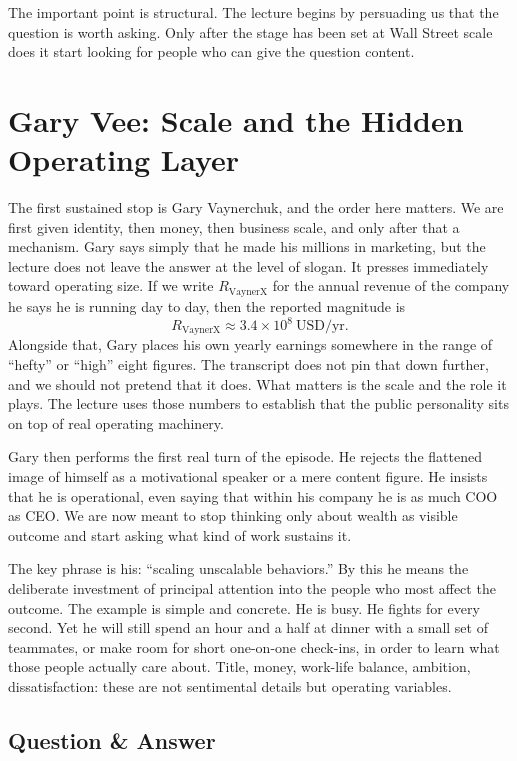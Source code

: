 The important point is structural. The lecture begins by persuading us that the question is worth asking. Only after the stage has been set at Wall Street scale does it start looking for people who can give the question content.

\section{Gary Vee: Scale and the Hidden Operating Layer}

The first sustained stop is Gary Vaynerchuk, and the order here matters. We are first given identity, then money, then business scale, and only after that a mechanism. Gary says simply that he made his millions in marketing, but the lecture does not leave the answer at the level of slogan. It presses immediately toward operating size. If we write $R_{\mathrm{VaynerX}}$ for the annual revenue of the company he says he is running day to day, then the reported magnitude is
\begin{equation}
R_{\mathrm{VaynerX}} \approx 3.4\times 10^8\ \mathrm{USD/yr}.
\end{equation}
Alongside that, Gary places his own yearly earnings somewhere in the range of ``hefty'' or ``high'' eight figures. The transcript does not pin that down further, and we should not pretend that it does. What matters is the scale and the role it plays. The lecture uses those numbers to establish that the public personality sits on top of real operating machinery.

Gary then performs the first real turn of the episode. He rejects the flattened image of himself as a motivational speaker or a mere content figure. He insists that he is operational, even saying that within his company he is as much COO as CEO. We are now meant to stop thinking only about wealth as visible outcome and start asking what kind of work sustains it.

The key phrase is his: ``scaling unscalable behaviors.'' By this he means the deliberate investment of principal attention into the people who most affect the outcome. The example is simple and concrete. He is busy. He fights for every second. Yet he will still spend an hour and a half at dinner with a small set of teammates, or make room for short one-on-one check-ins, in order to learn what those people actually care about. Title, money, work-life balance, ambition, dissatisfaction: these are not sentimental details but operating variables.

\subsection{Question \& Answer}


